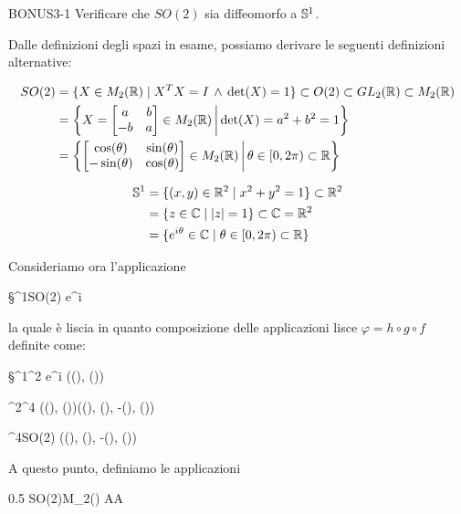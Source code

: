 {BONUS3-1}
{
Verificare che $ SO(2) $ sia diffeomorfo a $ \S^{1} $.
}
{
Dalle definizioni degli spazi in esame, possiamo derivare le seguenti definizioni alternative:

\begin{align}
	\begin{split}
		SO(2) &= \{ X \in M_{2}(\R) \mid X^{T} X = I \, \wedge \, \det(X) = 1 \} \subset O(2) \subset GL_{2}(\R) \subset M_{2}(\R) \\
		&= \left\{ X = \bmqty{ a & b \\ -b & a } \in M_{2}(\R) \st \det(X) = a^{2} + b^{2} = 1 \right\} \\
		&= \left\{ \bmqty{ \cos(\theta) & \sin(\theta) \\ -\sin(\theta) & \cos(\theta) } \in M_{2}(\R) \st \theta \in [0,2\pi) \subset \R \right\}
	\end{split}
\end{align}

\begin{align}
	\begin{split}
		\S^{1} &= \{ (x,y) \in \R^{2} \mid x^{2} + y^{2} = 1 \} \subset \R^{2} \\
		&= \{ z \in \C \mid \abs{z} = 1 \} \subset \C = \R^{2} \\
		&= \{ e^{i \theta} \in \C \mid \theta \in [0,2\pi) \subset \R \}
	\end{split}
\end{align}

Consideriamo ora l'applicazione

\map{\varphi}
	{\S^{1}}{SO(2)}
	{e^{i \theta}}{\bmqty{ \cos(\theta) & \sin(\theta) \\ -\sin(\theta) & \cos(\theta) }}

la quale è liscia in quanto composizione delle applicazioni lisce $ \varphi = h \circ g \circ f $ definite come:

	{\S^{1}}{\R^{2}}
	{e^{i \theta}}{(\cos(\theta), \sin(\theta))}

	{\R^{2}}{\R^{4}}
	{(\cos(\theta), \sin(\theta))}{(\cos(\theta), \sin(\theta), -\sin(\theta), \cos(\theta))}

	{\R^{4}}{SO(2)}
	{(\cos(\theta), \sin(\theta), -\sin(\theta), \cos(\theta))}
	{\bmqty{ \cos(\theta) & \sin(\theta) \\ -\sin(\theta) & \cos(\theta) }}

A questo punto, definiamo le applicazioni

	{0.5}{%
				{SO(2)}{M_{2}(\R)}
				{A}{A}
			}

}
